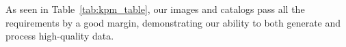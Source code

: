 \documentclass[\docopts]{\docclass}
\begin{document}
As seen in Table~\ref{tab:kpm_table}, our images and catalogs pass all the requirements by a good margin, demonstrating our ability to both generate and process high-quality data.

\end{document}
